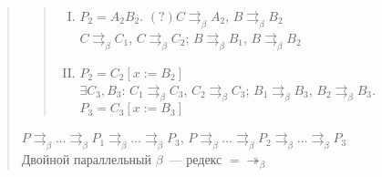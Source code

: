 \documentclass[12pt]{article}
\begin{document}
\begin{quote}
\begin{quote}
\begin{itemize}
\begin{enumerate}[(I)]
					\item $P_2 = A_2B_2$. $(?)C \rightrightarrows_{\beta} A_2$, $B \rightrightarrows_{\beta} B_2$ \\
					$C \rightrightarrows_{\beta} C_1$, $C \rightrightarrows_{\beta} C_2$; $B \rightrightarrows_{\beta} B_1$, $B \rightrightarrows_{\beta} B_2$
					\item $P_2 = C_2 [x := B_2]$ \\
					$\exists C_3, B_3$: $C_1 \rightrightarrows_{\beta} C_3$, $C_2 \rightrightarrows_{\beta} C_3$; $B_1 \rightrightarrows_{\beta} B_3$, $B_2 \rightrightarrows_{\beta} B_3$. $P_3 = C_3 [x := B_3]$
				\end{enumerate}
			\end{itemize}
		\end{quote}
		$P \rightrightarrows_{\beta} \dots \rightrightarrows_{\beta} P_1 \rightrightarrows_{\beta} \dots \rightrightarrows_{\beta} P_3$, $P \rightrightarrows_{\beta} \dots \rightrightarrows_{\beta} P_2 \rightrightarrows_{\beta} \dots \rightrightarrows_{\beta} P_3$ \\
		Двойной параллельный $\beta$~--- редекс $= \twoheadrightarrow_{\beta}$
	\end{quote}
\end{document}
